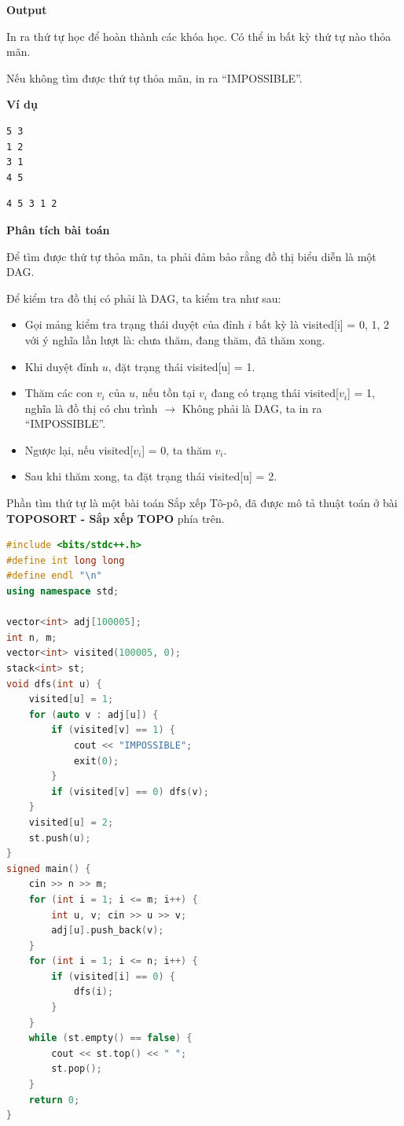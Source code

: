 \documentclass{article}
\begin{document}
\textbf{Output}

In ra thứ tự học để hoàn thành các khóa học. Có thể in bất kỳ thứ tự nào thỏa mãn. 

Nếu không tìm được thứ tự thỏa mãn, in ra ``IMPOSSIBLE''.

\textbf{Ví dụ}

\begin{lstlisting}[caption={Input}]
5 3
1 2
3 1
4 5
\end{lstlisting}

\begin{lstlisting}[caption={Output}]
4 5 3 1 2
\end{lstlisting}

\textbf{Phân tích bài toán}

Để tìm được thứ tự thỏa mãn, ta phải đảm bảo rằng đồ thị biểu diễn là một DAG. 

Để kiểm tra đồ thị có phải là DAG, ta kiểm tra như sau:
\begin{itemize}
    \item Gọi mảng kiểm tra trạng thái duyệt của đỉnh $i$ bất kỳ là visited[i] = {0, 1, 2} với ý nghĩa lần lượt là: chưa thăm, đang thăm, đã thăm xong.
    \item Khi duyệt đỉnh $u$, đặt trạng thái visited[u] = 1.
    \item Thăm các con $v_i$ của $u$, nếu tồn tại $v_i$ đang có trạng thái visited[$v_i$] = 1, nghĩa là đồ thị có chu trình $\rightarrow$ Không phải là DAG, ta in ra ``IMPOSSIBLE''.
    \item Ngược lại, nếu visited[$v_i$] = 0, ta thăm $v_i$.
    \item Sau khi thăm xong, ta đặt trạng thái visited[u] = 2. 
\end{itemize}

Phần tìm thứ tự là một bài toán Sắp xếp Tô-pô, đã được mô tả thuật toán ở bài \textbf{TOPOSORT - Sắp xếp TOPO} phía trên.

\begin{lstlisting}[language=C++, caption={Cài đặt}, label={code:CourseSchedule}]
#include <bits/stdc++.h>
#define int long long
#define endl "\n"
using namespace std;

vector<int> adj[100005];
int n, m; 
vector<int> visited(100005, 0);
stack<int> st;
void dfs(int u) {
    visited[u] = 1;
    for (auto v : adj[u]) {
        if (visited[v] == 1) {
            cout << "IMPOSSIBLE";
            exit(0);
        }
        if (visited[v] == 0) dfs(v);
    }
    visited[u] = 2;
    st.push(u);
}
signed main() {
    cin >> n >> m;
    for (int i = 1; i <= m; i++) {
        int u, v; cin >> u >> v;
        adj[u].push_back(v);
    }    
    for (int i = 1; i <= n; i++) {
        if (visited[i] == 0) {
            dfs(i);
        }
    }
    while (st.empty() == false) {
        cout << st.top() << " ";
        st.pop();
    }
    return 0;
}
\end{lstlisting}
\end{document}
